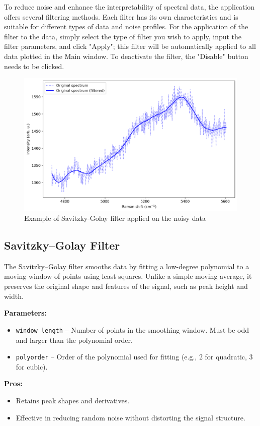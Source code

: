 To reduce noise and enhance the interpretability of spectral data, the application offers several filtering methods. Each filter has its own characteristics and is suitable for different types of data and noise profiles. For the application of the filter to the data, simply select the type of filter you wish to apply, input the filter parameters, and click "Apply"; this filter will be automatically applied to all data plotted in the Main window. To deactivate the filter, the "Disable" button needs to be clicked.

\begin{figure}[H]
    \centering
    \includegraphics[width=0.75\linewidth]{Resources/filter.png}
    \caption{Example of Savitzky-Golay filter applied on the noisy data}
    \label{filter}
\end{figure}

\subsection{Savitzky–Golay Filter}

The Savitzky–Golay filter smooths data by fitting a low-degree polynomial to a moving window of points using least squares. Unlike a simple moving average, it preserves the original shape and features of the signal, such as peak height and width.

\textbf{Parameters:}
\begin{itemize}
    \item \texttt{window length} – Number of points in the smoothing window. Must be odd and larger than the polynomial order.
    \item \texttt{polyorder} – Order of the polynomial used for fitting (e.g., 2 for quadratic, 3 for cubic).
\end{itemize}

\textbf{Pros:}
\begin{itemize}
    \item Retains peak shapes and derivatives.
    \item Effective in reducing random noise without distorting the signal structure.
\end{itemize}

